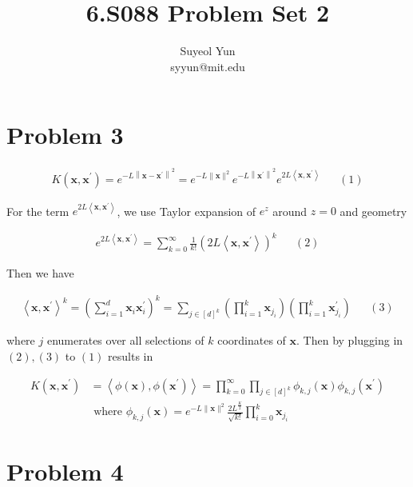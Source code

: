 \documentclass[13pt]{article}
\begin{document}
 
\title{6.S088 Problem Set 2}
\author{Suyeol Yun\\
syyun@mit.edu}
\maketitle
 
\section{Problem 3}
\begin{align*}
    K\left(\mathbf{x}, \mathbf{x}^{\prime}\right)=e^{-L\left\|\mathbf{x} - \mathbf{x}^{\prime}\right\|^2}=e^{-L\|\mathbf{x}\|^2} e^{-L\left\|\mathbf{x}^{\prime}\right\|^2} e^{2L\left\langle\mathbf{x}, \mathbf{x}^{\prime}\right\rangle} && (1)
\end{align*}

For the term $e^{2L\left\langle\mathbf{x}, \mathbf{x}^{\prime}\right\rangle}$, we use Taylor expansion of $e^z$ around $z=0$ and geometry

\begin{align*}
    e^{2L\left\langle\mathbf{x}, \mathbf{x}^{\prime}\right\rangle}=\sum_{k=0}^{\infty} \frac{1}{k !}\left(2L\left\langle\mathbf{x}, \mathbf{x}^{\prime}\right\rangle\right)^k && (2)
\end{align*}

Then we have 

\begin{align*}
    \left\langle\mathbf{x}, \mathbf{x}^{\prime}\right\rangle^k=\left(\sum_{i=1}^d \mathbf{x}_i \mathbf{x}_i^{\prime}\right)^k=\sum_{j \in[d]^k}\left(\prod_{i=1}^k \mathbf{x}_{j_i}\right)\left(\prod_{i=1}^k \mathbf{x}_{j_i}^{\prime}\right) && (3)
\end{align*}

where $j$ enumerates over all selections of $k$ coordinates of $\mathbf{x}$. Then by plugging in $(2), (3)$ to $(1)$ results in

\begin{align*}
    K\left(\mathbf{x}, \mathbf{x}^{\prime}\right)&=\left\langle\phi(\mathbf{x}), \phi\left(\mathbf{x}^{\prime}\right)\right\rangle=\prod_{k=0}^{\infty} \prod_{j \in[d]^k} \phi_{k, j}(\mathbf{x}) \phi_{k, j}\left(\mathbf{x}^{\prime}\right)\\
    &\text{ where }     \phi_{k, j}(\mathbf{x})=e^{-L\|\mathbf{x}\|^2} \frac{2L^{\frac{K}{2}}}{\sqrt{k !}} \prod_{i=0}^k \mathbf{x}_{j_i}
\end{align*}

\section{Problem 4}
\end{document}
